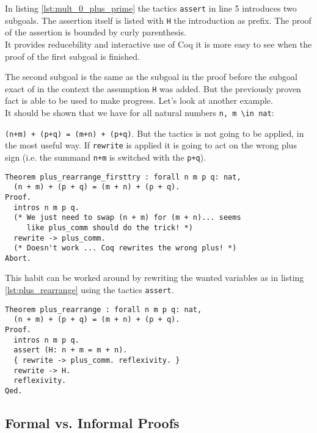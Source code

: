 In listing \ref{lst:mult_0_plus_prime} the tactics \lstinline!assert! in line 5 introduces two subgoals. 
The assertion itself is listed with \lstinline!H! the introduction as prefix.
The proof of the assertion is bounded by curly parenthesis.\\
It provides reducebility and interactive use of Coq it is more easy to see when the proof of the first subgoal is finished.

The second subgoal is the same as the subgoal in the proof before the subgoal exact of in the context the assumption \lstinline!H! was added.
But the previously proven fact is able to be used to make progress.
Let's look at another example.\\
 
It should be shown that we have for all natural numbers \lstinline!n, m \in nat!:
 
\lstinline!(n+m) + (p+q) = (m+n) + (p+q)!.
But the tactics is not going to be applied, in the most useful way. 
If \lstinline!rewrite! is applied it is going to act on the wrong plus sign (i.e. the summand \lstinline!n+m! is switched with the \lstinline!p+q!).
\begin{lstlisting}[caption = \lstinline!plus_rearrange_firstttry!, label=lst:plus_rearrange_firsttry]
Theorem plus_rearrange_firsttry : forall n m p q: nat,
  (n + m) + (p + q) = (m + n) + (p + q).
Proof.
  intros n m p q.
  (* We just need to swap (n + m) for (m + n)... seems
     like plus_comm should do the trick! *)
  rewrite -> plus_comm.
  (* Doesn't work ... Coq rewrites the wrong plus! *)
Abort.
\end{lstlisting}

This habit can be worked around by rewriting the wanted variables as in listing \ref{lst:plus_rearrange} using the tactics \lstinline!assert!. 

\begin{lstlisting}[caption = \lstinline!plus_rearrange!, label = lst:plus_rearrange]
Theorem plus_rearrange : forall n m p q: nat,
  (n + m) + (p + q) = (m + n) + (p + q).
Proof.
  intros n m p q.
  assert (H: n + m = m + n).
  { rewrite -> plus_comm. reflexivity. }
  rewrite -> H. 
  reflexivity.  
Qed.
\end{lstlisting}


\subsection{Formal vs. Informal Proofs}


